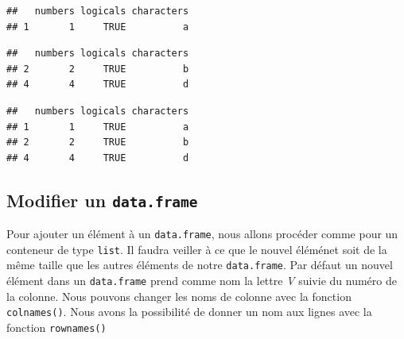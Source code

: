 \documentclass[]{book}
\newenvironment{Shaded}{\begin{snugshade}}{\end{snugshade}}
\newcommand{\KeywordTok}[1]{\textcolor[rgb]{0.13,0.29,0.53}{\textbf{#1}}}
\newcommand{\DecValTok}[1]{\textcolor[rgb]{0.00,0.00,0.81}{#1}}
\newcommand{\StringTok}[1]{\textcolor[rgb]{0.31,0.60,0.02}{#1}}
\newcommand{\OtherTok}[1]{\textcolor[rgb]{0.56,0.35,0.01}{#1}}
\newcommand{\OperatorTok}[1]{\textcolor[rgb]{0.81,0.36,0.00}{\textbf{#1}}}
\newcommand{\NormalTok}[1]{#1}
\begin{document}
\begin{verbatim}
##   numbers logicals characters
## 1       1     TRUE          a
\end{verbatim}

\begin{Shaded}
\end{Shaded}

\begin{verbatim}
##   numbers logicals characters
## 2       2     TRUE          b
## 4       4     TRUE          d
\end{verbatim}

\begin{Shaded}
\end{Shaded}

\begin{verbatim}
##   numbers logicals characters
## 1       1     TRUE          a
## 2       2     TRUE          b
## 4       4     TRUE          d
\end{verbatim}

\subsection{\texorpdfstring{Modifier un
\texttt{data.frame}}{Modifier un data.frame}}\label{modifier-un-data.frame}

Pour ajouter un élément à un \texttt{data.frame}, nous allons procéder
comme pour un conteneur de type \texttt{list}. Il faudra veiller à ce
que le nouvel éléménet soit de la même taille que les autres éléments de
notre \texttt{data.frame}. Par défaut un nouvel élément dans un
\texttt{data.frame} prend comme nom la lettre \emph{V} suivie du numéro
de la colonne. Nous pouvons changer les noms de colonne avec la fonction
\texttt{colnames()}. Nous avons la possibilité de donner un nom aux
lignes avec la fonction \texttt{rownames()}
\end{document}
